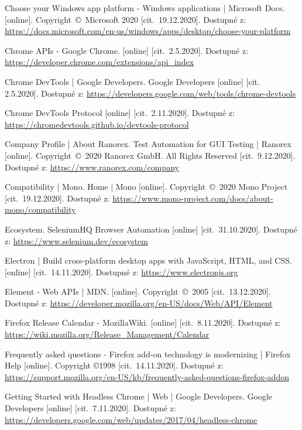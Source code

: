 \begin{thebibliography}{99}
 Choose your Windows app platform - Windows applications | Microsoft Docs. [online]. Copyright~©~Microsoft 2020 [cit.~19.12.2020]. Dostupné z: \url{https://docs.microsoft.com/en-us/windows/apps/desktop/choose-your-platform}

 Chrome APIs - Google Chrome. [online] [cit.~2.5.2020]. Dostupné z: \url{https://developer.chrome.com/extensions/api_index}

 Chrome DevTools  |  Google Developers. Google Developers [online] [cit.~	2.5.2020]. Dostupné z: 	\url{https://developers.google.com/web/tools/chrome-devtools}

 Chrome DevTools Protocol [online] [cit.~2.11.2020]. Dostupné z: \url{https://chromedevtools.github.io/devtools-protocol}

 Company Profile | About Ranorex. Test Automation for GUI Testing | Ranorex [online]. Copyright~©~2020 Ranorex GmbH. All Rights Reserved [cit.~9.12.2020]. Dostupné z: \url{https://www.ranorex.com/company}

 Compatibility | Mono. Home | Mono [online]. Copyright~©~2020 Mono Project [cit.~19.12.2020]. Dostupné z: \url{https://www.mono-project.com/docs/about-mono/compatibility}

 Ecosystem. SeleniumHQ Browser Automation [online] [cit.~31.10.2020]. Dostupné z: \url{https://www.selenium.dev/ecosystem}

 Electron | Build cross-platform desktop apps with JavaScript, HTML, and CSS. [online] [cit.~14.11.2020]. Dostupné z: \url{https://www.electronjs.org}

 Element - Web APIs | MDN. [online]. Copyright~©~2005 [cit.~13.12.2020]. Dostupné z: \url{https://developer.mozilla.org/en-US/docs/Web/API/Element}

 Firefox Release Calendar - MozillaWiki. [online] [cit.~8.11.2020]. Dostupné z: \url{https://wiki.mozilla.org/Release_Management/Calendar}

 Frequently asked questions - Firefox add-on technology is modernizing | Firefox Help [online]. Copyright ©1998 [cit.~14.11.2020]. Dostupné z: \url{https://support.mozilla.org/en-US/kb/frequently-asked-questions-firefox-addon}

 Getting Started with Headless Chrome  |  Web  |  Google Developers. Google Developers [online] [cit.~7.11.2020]. Dostupné z: \url{https://developers.google.com/web/updates/2017/04/headless-chrome}


\end{thebibliography}
